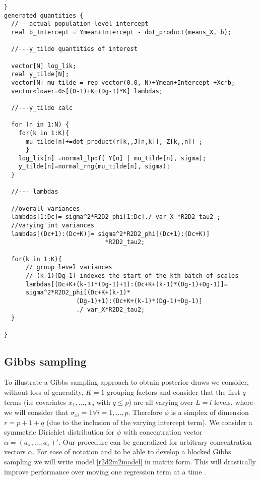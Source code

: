 \begin{small}
\begin{verbatim}
}
generated quantities {
  //---actual population-level intercept
  real b_Intercept = Ymean+Intercept - dot_product(means_X, b);

  //---y_tilde quantities of interest

  vector[N] log_lik;
  real y_tilde[N];
  vector[N] mu_tilde = rep_vector(0.0, N)+Ymean+Intercept +Xc*b;
  vector<lower=0>[(D-1)+K+(Dg-1)*K] lambdas;

  //---y_tilde calc

  for (n in 1:N) {
    for(k in 1:K){
      mu_tilde[n]+=dot_product(r[k,,J[n,k]], Z[k,,n]) ;
      }
    log_lik[n] =normal_lpdf( Y[n] | mu_tilde[n], sigma);
    y_tilde[n]=normal_rng(mu_tilde[n], sigma);
  }

  //--- lambdas

  //overall variances
  lambdas[1:Dc]= sigma^2*R2D2_phi[1:Dc]./ var_X *R2D2_tau2 ;
  //varying int variances
  lambdas[(Dc+1):(Dc+K)]= sigma^2*R2D2_phi[(Dc+1):(Dc+K)]
                            *R2D2_tau2;

  for(k in 1:K){
      // group level variances
      // (k-1)(Dg-1) indexes the start of the kth batch of scales
      lambdas[(Dc+K+(k-1)*(Dg-1)+1):(Dc+K+(k-1)*(Dg-1)+Dg-1)]=
      sigma^2*R2D2_phi[(Dc+K+(k-1)*
                    (Dg-1)+1):(Dc+K+(k-1)*(Dg-1)+Dg-1)]
                    ./ var_X*R2D2_tau2;
  }

}
\end{verbatim}

\end{small}


\subsection{Gibbs sampling}

	To illustrate a Gibbs sampling approach to obtain posterior draws we consider, without loss of generality,  $K=1$ grouping factors and consider that the first $q$ terms (i.e covariates $x_1,...,x_q$ with $q\leq p$) are all varying over $L=l$ levels, where we will consider that $\sigma_{xi}=1 \forall i=1,...,p$.  Therefore $\phi$ is a simplex of dimension $r=p+1+q$ (due to the inclusion of the varying intercept term). We consider a symmetric Dirichlet distribution for $\phi$ with concentration vector $\alpha = (a_\pi,..., a_\pi)'$. Our procedure can be generalized for arbitrary concentration vectors $\alpha$. For ease of notation and to be able to develop a blocked Gibbs sampling we will write model \eqref{r2d2m2model} in matrix form. This will drastically improve performance over moving one regression term at a time .


